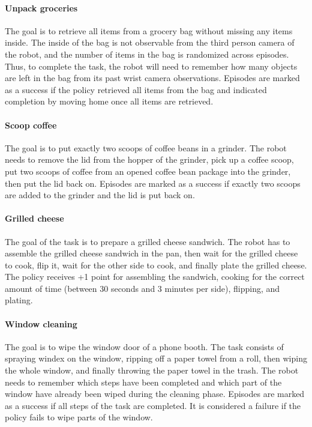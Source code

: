 \paragraph{Unpack groceries} The goal is to retrieve all items from a grocery bag without missing any items inside. The inside of the bag is not observable from the third person camera of the robot, and the number of items in the bag is randomized across episodes. Thus, to complete the task, the robot will need to remember how many objects are left in the bag from its past wrist camera observations. Episodes are marked as a success if the policy retrieved all items from the bag and indicated completion by moving home once all items are retrieved.

\paragraph{Scoop coffee} The goal is to put exactly two scoops of coffee beans in a grinder. The robot needs to remove the lid from the hopper of the grinder, pick up a coffee scoop, put two scoops of coffee from an opened coffee bean package into the grinder, then put the lid back on. Episodes are marked as a success if exactly two scoops are added to the grinder and the lid is put back on.

\paragraph{Grilled cheese} The goal of the task is to prepare a grilled cheese sandwich. The robot has to assemble the grilled cheese sandwich in the pan, then wait for the grilled cheese to cook, flip it, wait for the other side to cook, and finally plate the grilled cheese. The policy receives +1 point for assembling the sandwich, cooking for the correct amount of time (between 30 seconds and 3 minutes per side), flipping, and plating.

\paragraph{Window cleaning} The goal is to wipe the window door of a phone booth. The task consists of spraying windex on the window, ripping off a paper towel from a roll, then wiping the whole window, and finally throwing the paper towel in the trash. The robot needs to remember which steps have been completed and which part of the window have already been wiped during the cleaning phase. Episodes are marked as a success if all steps of the task are completed. It is considered a failure if the policy fails to wipe parts of the window.

